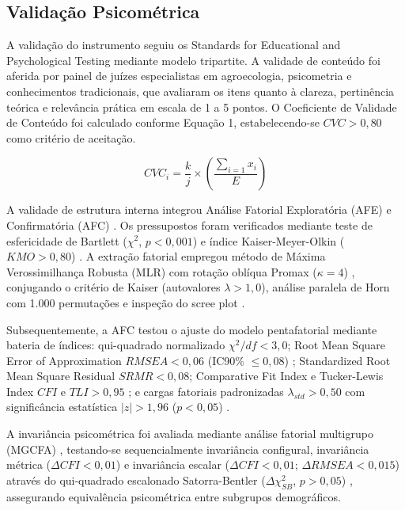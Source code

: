 \subsection{Validação Psicométrica}

A validação do instrumento seguiu os Standards for Educational and Psychological Testing mediante modelo tripartite. A validade de conteúdo foi aferida por painel de juízes especialistas em agroecologia, psicometria e conhecimentos tradicionais, que avaliaram os itens quanto à clareza, pertinência teórica e relevância prática em escala de 1 a 5 pontos. O Coeficiente de Validade de Conteúdo foi calculado conforme Equação 1, estabelecendo-se $CVC > 0,80$ como critério de aceitação.

\begin{equation}
CVC_i = \frac{k}{j} \times \left(\frac{\sum_{i=1} x_i}{E}\right)
\end{equation}

A validade de estrutura interna integrou Análise Fatorial Exploratória (AFE) \cite{Fabrigar1999} e Confirmatória (AFC) \cite{Brown2015}. Os pressupostos foram verificados mediante teste de esfericidade de Bartlett ($\chi^2$, $p < 0,001$) e índice Kaiser-Meyer-Olkin ($KMO > 0,80$) \cite{Kaiser1974}. A extração fatorial empregou método de Máxima Verossimilhança Robusta (MLR) com rotação oblíqua Promax ($\kappa = 4$) \cite{Satorra1994}, conjugando o critério de Kaiser (autovalores $\lambda > 1,0$), análise paralela de Horn com 1.000 permutações \cite{Horn1965} e inspeção do scree plot \cite{Cattell1966}.

Subsequentemente, a AFC testou o ajuste do modelo pentafatorial mediante bateria de índices: qui-quadrado normalizado $\chi^2/df < 3,0$; Root Mean Square Error of Approximation $RMSEA < 0,06$ (IC90\% $\leq 0,08$) \cite{Browne1992}; Standardized Root Mean Square Residual $SRMR < 0,08$; Comparative Fit Index e Tucker-Lewis Index $CFI$ e $TLI > 0,95$ \cite{Hu1999}; e cargas fatoriais padronizadas $\lambda_{std} > 0,50$ com significância estatística $|z| > 1,96$ ($p < 0,05$) \cite{Hair2019}. 

A invariância psicométrica foi avaliada mediante análise fatorial multigrupo (MGCFA) \cite{Milfont2010}, testando-se sequencialmente invariância configural, invariância métrica ($\Delta CFI < 0,01$) \cite{Cheung2002} e invariância escalar ($\Delta CFI < 0,01$; $\Delta RMSEA < 0,015$) \cite{Chen2007} através do qui-quadrado escalonado Satorra-Bentler ($\Delta\chi^2_{SB}$, $p > 0,05$) \cite{Satorra2001}, assegurando equivalência psicométrica entre subgrupos demográficos.

